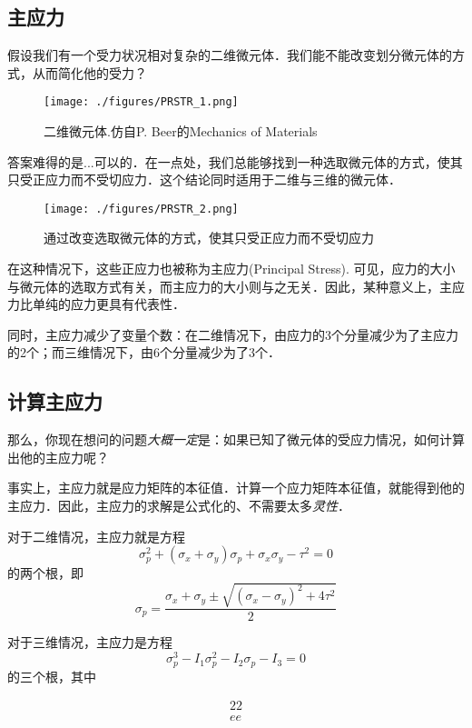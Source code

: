 
\begin{issues}
\issueDraft
\end{issues}

\subsection{主应力}
假设我们有一个受力状况相对复杂的二维微元体．我们能不能改变划分微元体的方式，从而简化他的受力？
\begin{figure}[ht]
\centering
\texttt{[image: ./figures/PRSTR\_1.png]}
\caption{二维微元体.仿自P. Beer的Mechanics of Materials} \label{PRSTR_fig1}
\end{figure}

答案难得的是...可以的．在一点处，我们总能够找到一种选取微元体的方式，使其只受正应力而不受切应力．这个结论同时适用于二维与三维的微元体．
\begin{figure}[ht]
\centering
\texttt{[image: ./figures/PRSTR\_2.png]}
\caption{通过改变选取微元体的方式，使其只受正应力而不受切应力} \label{PRSTR_fig2}
\end{figure}
在这种情况下，这些正应力也被称为主应力(Principal Stress). 可见，应力的大小与微元体的选取方式有关，而主应力的大小则与之无关．因此，某种意义上，主应力比单纯的应力更具有代表性．

同时，主应力减少了变量个数：在二维情况下，由应力的3个分量减少为了主应力的2个；而三维情况下，由6个分量减少为了3个．

\subsection{计算主应力}

那么，你现在想问的问题\textsl{大概一定}是：如果已知了微元体的受应力情况，如何计算出他的主应力呢？

事实上，主应力就是应力矩阵的本征值．计算一个应力矩阵本征值，就能得到他的主应力．因此，主应力的求解是公式化的、不需要太多\textsl{灵性}．

对于二维情况，主应力就是方程
$$\sigma_p^2+(\sigma_x+\sigma_y)\sigma_p+\sigma_x\sigma_y-\tau^2=0$$
的两个根，即
$$\sigma_p=\frac{\sigma_x+\sigma_y \pm \sqrt{(\sigma_x-\sigma_y)^2+4\tau^2}}{2}$$

对于三维情况，主应力是方程 
$$
\sigma_p^3-I_1\sigma_p^2-I_2\sigma_p-I_3=0
$$
的三个根，其中

$$
\begin{aligned}
22\\
ee\\
\end{aligned}
$$